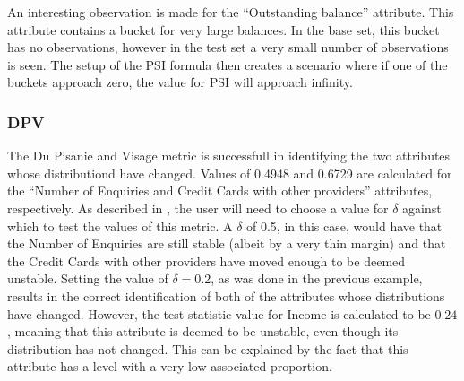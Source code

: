 \documentclass{article}
\theoremstyle{def}
\begin{document}
An interesting observation is made for the ``Outstanding balance'' attribute. This attribute contains a bucket for very large balances. In the base set, this bucket has no observations, however in the test set a very small number of observations is seen. The setup of the PSI formula then creates a scenario where if one of the buckets approach zero, the value for PSI will approach infinity. 

\subsubsection{DPV}

The Du Pisanie and Visage metric is successfull in identifying the two attributes whose distributiond have changed. Values of 0.4948 and 0.6729 are calculated for the ``Number of Enquiries and Credit Cards with other providers'' attributes, respectively. As described in \cite{DUPISANIEVISAGIE2020}, the user will need to choose a value for $\delta$ against which to test the values of this metric.  A $\delta$ of 0.5, in this case, would have that the Number of Enquiries are still stable (albeit by a very thin margin) and that the Credit Cards with other providers have moved enough to be deemed unstable. Setting the value of $\delta=0.2$, as was done in the previous example, results in the correct identification of both of the attributes whose distributions have changed. However, the test statistic value for Income is calculated to be $0.24$, meaning that this attribute is deemed to be unstable, even though its distribution has not changed. This can be explained by
the fact that this attribute has a level with a very low associated proportion.
\end{document}
